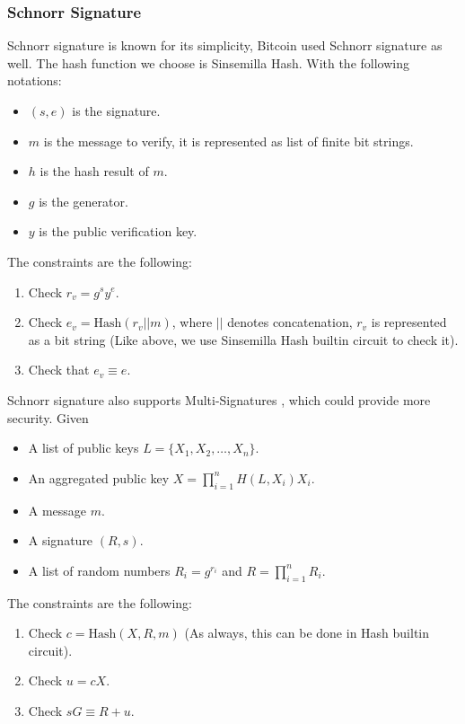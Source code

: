 \subsubsection{Schnorr Signature}

Schnorr signature is known for its simplicity, Bitcoin used Schnorr signature as well. The hash function we choose is Sinsemilla Hash. With the following notations:
\begin{itemize}
    \item $(s, e)$ is the signature.
    \item $m$ is the message to verify, it is represented as list of finite bit strings.
    \item $h$ is the hash result of $m$.
    \item $g$ is the generator.
    \item $y$ is the public verification key.
\end{itemize}

The constraints are the following:
\begin{enumerate}
    \item Check $r_v = g^s y^e$.
    \item Check $e_v = \mathrm{Hash}(r_v \mathbin{||} m)$, where $||$ denotes concatenation, $r_v$ is represented as a bit string (Like above, we use Sinsemilla Hash builtin circuit to check it).
    \item Check that $e_v \equiv e$.
\end{enumerate}

\vspace{3mm}
Schnorr signature also supports Multi-Signatures \cite{cryptoeprint:2018/068}, which could provide more security. Given
\begin{itemize}
    \item A list of public keys $L = \{X_1, X_2, \ldots, X_n\}$.
    \item An aggregated public key $X = \prod_{i=1}^n H(L, X_i) X_i$.
    \item A message $m$.
    \item A signature $(R, s)$.
    \item A list of random numbers $R_i = g^{r_i}$ and $R=\prod_{i=1}^n R_i$.
\end{itemize}

The constraints are the following:
\begin{enumerate}
    \item Check $c = \mathrm{Hash}(X, R, m)$ (As always, this can be done in Hash builtin circuit).
    \item Check $u = c X$.
    \item Check $s G \equiv R + u$.
\end{enumerate}
